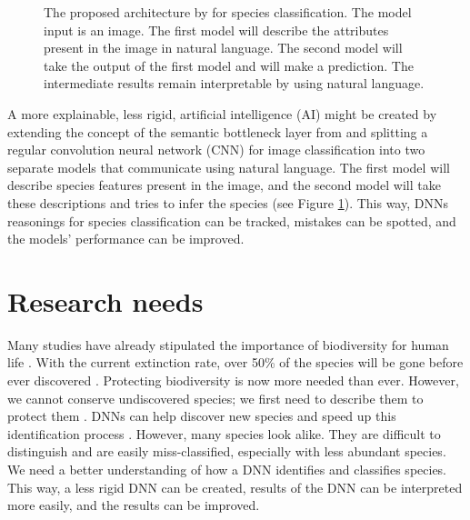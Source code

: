 \documentclass[a4paper, 12pt, oneside]{book} %
\begin{document}
\begin{figure} [htbp]
    \centering
    \vspace{0cm}
    \caption[Proposed architecture]{The proposed architecture by \textcite{ishikawa_contextual_2021} for species classification. The model input is an image. The first model will describe the attributes present in the image in natural language. The second model will take the output of the first model and will make a prediction. The intermediate results remain interpretable by using natural language.}
    \label{fig:intro}
\end{figure}

A more explainable, less rigid, artificial intelligence (AI) might be created by extending the concept of the semantic bottleneck layer from \textcite{ishikawa_contextual_2021} and splitting a regular convolution neural network (CNN) for image classification into two separate models that communicate using natural language.
The first model will describe species features present in the image, and the second model will take these descriptions and tries to infer the species (see Figure \ref{fig:intro}).
This way, DNNs reasonings for species classification can be tracked, mistakes can be spotted, and the models' performance can be improved.
\newpage

\section{Research needs}
Many studies have already stipulated the importance of biodiversity for human life \autocite{pimentel_economic_1997, gowdy_value_1997, raffaelli_links_2010, joppa_biodiversity_2011, pimm_how_2018}.
With the current extinction rate, over 50\% of the species will be gone before ever discovered \autocite{lees_species_2015}.
Protecting biodiversity is now more needed than ever.
However, we cannot conserve undiscovered species; we first need to describe them to protect them \autocite{joppa_biodiversity_2011}.
DNNs can help discover new species and speed up this identification process \autocite{van_horn_inaturalist_2018}.
However, many species look alike.
They are difficult to distinguish and are easily miss-classified, especially with less abundant species.
We need a better understanding of how a DNN identifies and classifies species. 
This way, a less rigid DNN can be created, results of the DNN can be interpreted more easily, and the results can be improved.
\end{document}
